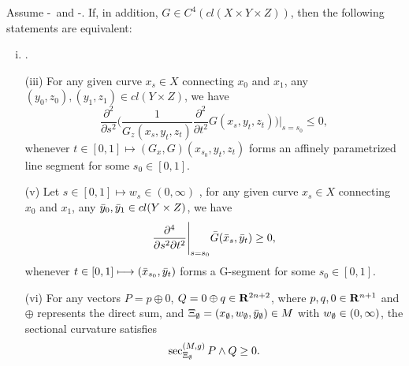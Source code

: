 \begin{theorem}\label{prop:4thorder2}
	Assume \Gzero-\Gtwo\ and \Gfour-\Geight. If, in addition, $G\in C^4(cl(X\times Y \times Z)
	)$,  then the following statements are equivalent:
	\begin{enumerate}[(i)]
		\item \Gthree.
				
		\item[(iii)] For any given curve $x_s\in X$ connecting $x_0$ and $x_1$,  any $(y_0, z_0),  (y_1, z_1) \in cl( Y \times Z) $, we have 
		\begin{equation}
		\frac{\partial^2}{\partial s^2 }\Biggl(\frac{1}{G_z(x_s, y_t, z_t)}\frac{\partial^2}{\partial t^2} G(x_s,y_t,z_t) \Biggr)\Bigg|_{s=s_0}\le 0,
		\end{equation}
		whenever $t\in [0,1] \longmapsto (G_x, G)(x_{s_0}, y_t, z_t)$  forms an affinely parametrized line segment for some $s_0\in [0,1]$.
		
	\item[(v)] Let $s\in [0,1] \longmapsto w_s \in (0, \infty)$
	, for any given curve $x_s\in X$ connecting $x_0$ and $x_1$, any $\bar{y}_0,  \bar{y}_1 \in cl( Y \times Z) $, we have 
	\begin{equation}\label{barG-4thorder}
	\frac{\partial^4}{\partial s^2 \partial t^2} \Bigg|_{s=s_0} \bar{G}(\bar{x}_s,\bar{y}_t)  \ge 0,
	\end{equation}
	whenever $t\in [0,1] \longmapsto (\bar{x}_{s_0}, \bar{y}_t)$  forms a G-segment for some $s_0\in [0,1]$.
	

	
	\item[(vi)] For any vectors $P = p \oplus 0$, $Q = 0 \oplus q \in {\mathbf R}^{2n+2}$, where $p, q, 0 \in {\mathbf R}^{n+1}$ and $\oplus$ represents the direct sum, and $\Xi_{{\emptyset}} = (x_{{\emptyset}}, w_{{\emptyset}}, \bar{y}_{{\emptyset}}) \in M$ with $w_{{\emptyset}} \in (0, \infty)$, the sectional curvature satisfies
		\begin{equation}\label{Curvature_sectional2}
		\sec_{\Xi_{{\emptyset}}}^{(M, g)} P \wedge Q \ge 0.
		\end{equation}
	\end{enumerate} 
\end{theorem}

